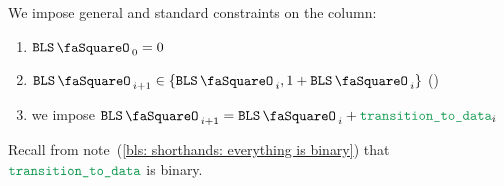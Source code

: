 We impose general and standard constraints on the \blsStamp{} column:
\begin{enumerate}
	\item $\blsStamp_{0} = 0$
	\item $\blsStamp_{i + 1} \in \{ \blsStamp_{i}, 1 + \blsStamp_{i} \}$ \quad (\trash)
	\item we impose $ \blsStamp_{i + 1} = \blsStamp_{i} + \locTransitionToData _{i} $
\end{enumerate}
\saNote{}
Recall from
note~(\ref{bls: shorthands: everything is binary})
that $\locTransitionToData$ is binary.